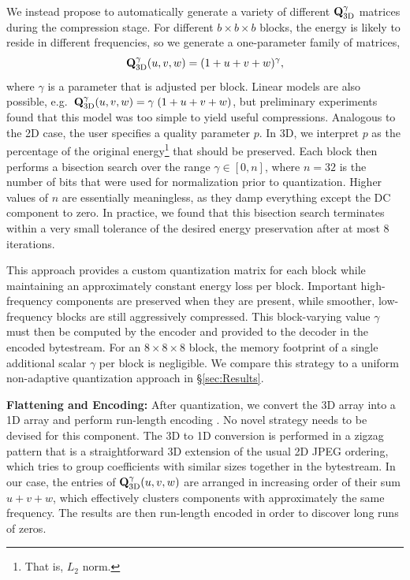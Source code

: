 We instead propose to automatically generate a variety of different $\mathbf{Q}^{\gamma}_{\textrm{3D}}$ matrices during the compression stage. For different $b \times b \times b$ blocks, the energy is likely to reside in different frequencies, so we generate a one-parameter family of matrices,
\begin{equation}
\mathbf{Q}^{\gamma}_{\textrm{3D}}(u,v,w) = (1 + u + v + w)^\gamma,
\end{equation}
where $\gamma$ is a parameter that is adjusted per block. Linear models are also possible, e.g.~$\mathbf{Q}^{\gamma}_{\textrm{3D}}(u,v,w) = \gamma\;(1 + u + v + w)$, but preliminary experiments found that this model was too simple to yield useful compressions. Analogous to the 2D case, the user specifies a quality parameter $p$. In 3D, we interpret $p$ as the percentage of the original energy\footnote{That is, $L_2$ norm.} that should be preserved. Each block then performs a bisection search over the range $\gamma \in [0, n]$, where $n = 32$ is the number of bits that were used for normalization prior to quantization. Higher values of $n$ are essentially meaningless, as they damp everything except the DC component to zero. In practice, we found that this bisection search terminates within a very small tolerance of the desired energy preservation after at most $8$ iterations.

This approach provides a custom quantization matrix for each block while maintaining an approximately constant energy loss per block. Important high-frequency components are preserved when they are present, while smoother, low-frequency blocks are still aggressively compressed. This block-varying value $\gamma$ must then be computed by the encoder and provided to the decoder in the encoded bytestream. For an $8 \times 8 \times 8$ block, the memory footprint of a single additional scalar $\gamma$ per block is negligible. We compare this strategy to a uniform non-adaptive quantization approach in \S\ref{sec:Results}.

\noindent \textbf{Flattening and Encoding:} After quantization, we convert the 3D array into a 1D array and perform run-length encoding \cite{Yeo:1995:VRD,Sayood:2012:JPEG}. No novel strategy needs to be devised for this component. The 3D to 1D conversion is performed in a zigzag pattern that is a straightforward 3D extension of the usual 2D JPEG ordering, which tries to group coefficients with similar sizes together in the bytestream.  In our case, the entries of $\mathbf{Q}^{\gamma}_{\textrm{3D}}(u,v,w)$ are arranged in increasing order of their sum $u + v + w$, which effectively clusters components with approximately the same frequency. The results are then run-length encoded in order to discover long runs of zeros.

